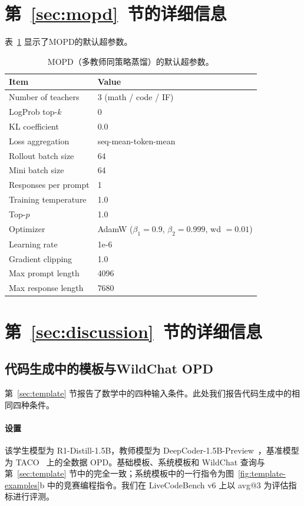 \section{第~\ref{sec:mopd}~节的详细信息}
表~\ref{tab:mopd-hyperparams} 显示了MOPD的默认超参数。

\begin{table}[!ht]
\centering
\caption{MOPD（多教师同策略蒸馏）的默认超参数。}
\label{tab:mopd-hyperparams}
\small
\begin{tabular}{ll}
\toprule
\textbf{Item} & \textbf{Value} \\
\midrule
Number of teachers      & 3 (math / code / IF) \\
LogProb top-$k$         & 0  \\
KL coefficient          & 0.0 \\
Loss aggregation        & seq-mean-token-mean \\
\midrule
Rollout batch size      & 64 \\
Mini batch size         & 64 \\
Responses per prompt    & 1 \\
Training temperature    & 1.0 \\
Top-$p$                 & 1.0 \\
\midrule
Optimizer               & AdamW ($\beta_1{=}0.9$, $\beta_2{=}0.999$, wd $=0.01$) \\
Learning rate           & 1e-6 \\
Gradient clipping       & 1.0 \\
\midrule
Max prompt length       & 4096 \\
Max response length     & 7680 \\
\bottomrule
\end{tabular}
\end{table}


\section{第~\ref{sec:discussion}~节的详细信息}

\subsection{代码生成中的模板与WildChat OPD}
\label{app:template-code}

第~\ref{sec:template} 节报告了数学中的四种输入条件。此处我们报告代码生成中的相同四种条件。

\paragraph{设置}
该学生模型为 R1-Distill-1.5B，教师模型为 DeepCoder-1.5B-Preview~\citep{deepcoder2025}，基准模型为 TACO~\citep{li2023taco} 上的全数据 OPD。基础模板、系统模板和 WildChat 查询与第~\ref{sec:template} 节中的完全一致；系统模板中的一行指令为图~\ref{fig:template-examples}b 中的竞赛编程指令。我们在 LiveCodeBench v6 上以 avg@3 为评估指标进行评测。

